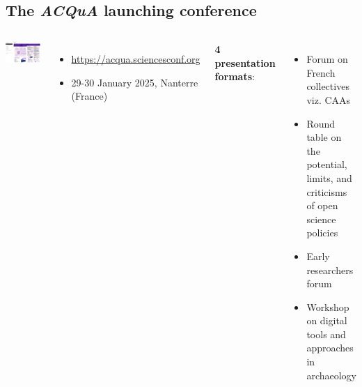\documentclass[xcolor=dvipsnames, 10pt, french, american]{beamer}
\begin{document}
\subsection{The \emph{ACQuA} launching conference}
\frame{\tableofcontents[sectionstyle=show/shaded, subsectionstyle=show/shaded/hide]}
 

\begin{frame}

    
    \begin{columns}[t]
    	
    	
            \includegraphics[height=0.4\textheight]{figures/acqua2025}
        
            \begin{itemize}
                \item \url{https://acqua.sciencesconf.org}
                \item 29-30 January 2025, Nanterre (France)
            \end{itemize}
            
            
            \textbf{4 presentation formats}:
            
            \begin{itemize}
                \item Forum on French collectives viz. CAAs %
                \item Round table on the potential, limits,  and criticisms of open science policies %
                \item  Early researchers forum %
                \item Workshop on digital tools and approaches in archaeology %
            \end{itemize}
    \end{columns}
\end{frame}
\end{document}
